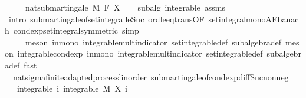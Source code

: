 \begin{isabellebody}
\ \ \ \ \ {\isachardoublequoteopen}nat{\isacharunderscore}{\kern0pt}submartingale\ M\ F\ X{\isachardoublequoteclose}\isanewline
%
\isadelimproof
\ \ %
\endisadelimproof
%
\isatagproof
{}\isamarkupfalse%
\ subalg\ integrable\ assms{\isacharparenleft}{\kern0pt}{}{\isacharparenright}{\kern0pt}\isanewline
\ \ \isamarkupfalse%
\ {\isacharparenleft}{\kern0pt}intro\ submartingale{\isacharunderscore}{\kern0pt}of{\isacharunderscore}{\kern0pt}set{\isacharunderscore}{\kern0pt}integral{\isacharunderscore}{\kern0pt}le{\isacharunderscore}{\kern0pt}Suc\ ord{\isacharunderscore}{\kern0pt}le{\isacharunderscore}{\kern0pt}eq{\isacharunderscore}{\kern0pt}trans{\isacharbrackleft}{\kern0pt}OF\ set{\isacharunderscore}{\kern0pt}integral{\isacharunderscore}{\kern0pt}mono{\isacharunderscore}{\kern0pt}AE{\isacharunderscore}{\kern0pt}banach\ cond{\isacharunderscore}{\kern0pt}exp{\isacharunderscore}{\kern0pt}set{\isacharunderscore}{\kern0pt}integral{\isacharbrackleft}{\kern0pt}symmetric{\isacharbrackright}{\kern0pt}{\isacharbrackright}{\kern0pt}{\isacharcomma}{\kern0pt}\ simp{\isacharparenright}{\kern0pt}\isanewline
\ \ \ \ \ {\isacharparenleft}{\kern0pt}meson\ in{\isacharunderscore}{\kern0pt}mono\ integrable{\isacharunderscore}{\kern0pt}mult{\isacharunderscore}{\kern0pt}indicator\ set{\isacharunderscore}{\kern0pt}integrable{\isacharunderscore}{\kern0pt}def\ subalgebra{\isacharunderscore}{\kern0pt}def{\isacharcomma}{\kern0pt}\ meson\ integrable{\isacharunderscore}{\kern0pt}cond{\isacharunderscore}{\kern0pt}exp\ in{\isacharunderscore}{\kern0pt}mono\ integrable{\isacharunderscore}{\kern0pt}mult{\isacharunderscore}{\kern0pt}indicator\ set{\isacharunderscore}{\kern0pt}integrable{\isacharunderscore}{\kern0pt}def\ subalgebra{\isacharunderscore}{\kern0pt}def{\isacharcomma}{\kern0pt}\ fast{\isacharplus}{\kern0pt}{\isacharparenright}{\kern0pt}%
\endisatagproof
{\isafoldproof}%
%
\isadelimproof
\isanewline
%
\endisadelimproof
\isanewline
{}\isamarkupfalse%
\ {\isacharparenleft}{\kern0pt}\ nat{\isacharunderscore}{\kern0pt}sigma{\isacharunderscore}{\kern0pt}finite{\isacharunderscore}{\kern0pt}adapted{\isacharunderscore}{\kern0pt}process{\isacharunderscore}{\kern0pt}linorder{\isacharparenright}{\kern0pt}\ submartingale{\isacharunderscore}{\kern0pt}of{\isacharunderscore}{\kern0pt}cond{\isacharunderscore}{\kern0pt}exp{\isacharunderscore}{\kern0pt}diff{\isacharunderscore}{\kern0pt}Suc{\isacharunderscore}{\kern0pt}nonneg{\isacharcolon}{\kern0pt}\isanewline
\ \ \ integrable{\isacharcolon}{\kern0pt}\ {\isachardoublequoteopen}{\isasymAnd}i{\isachardot}{\kern0pt}\ integrable\ M\ {\isacharparenleft}{\kern0pt}X\ i{\isacharparenright}{\kern0pt}{\isachardoublequoteclose}\ \isanewline

\end{isabellebody}
